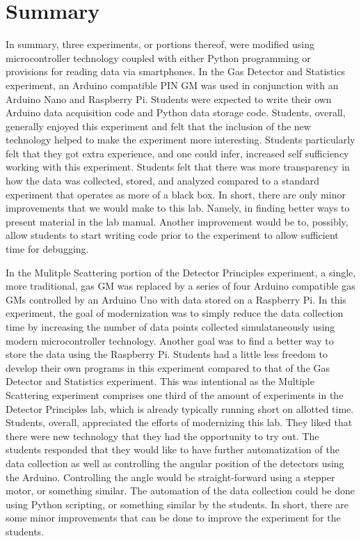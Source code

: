 \section{Summary}
In summary, three experiments, or portions thereof, were modified using microcontroller technology coupled with either Python programming or provisions for reading data via smartphones.
In the Gas Detector and Statistics experiment, an Arduino compatible PIN GM was used in conjunction with an Arduino Nano and Raspberry Pi.
Students were expected to write their own Arduino data acquisition code and Python data storage code.
Students, overall, generally enjoyed this experiment and felt that the inclusion of the new technology helped to make the experiment more interesting.
Students particularly felt that they got extra experience, and one could infer, increased self sufficiency working with this experiment.
Students felt that there was more transparency in how the data was collected, stored, and analyzed compared to a standard experiment that operates as more of a black box.
In short, there are only minor improvements that we would make to this lab.
Namely, in finding better ways to present material in the lab manual.
Another improvement would be to, possibly, allow students to start writing code prior to the experiment to allow sufficient time for debugging.

In the Mulitple Scattering portion of the Detector Principles experiment, a single, more traditional, gas GM was replaced by a series of four Arduino compatible gas GMs controlled by an Arduino Uno with data stored on a Raspberry Pi.
In this experiment, the goal of modernization was to simply reduce the data collection time by increasing the number of data points collected simulataneously using modern microcontroller technology.
Another goal was to find a better way to store the data using the Raspberry Pi.
Students had a little less freedom to develop their own programs in this experiment compared to that of the Gas Detector and Statistics experiment.
This was intentional as the Multiple Scattering experiment comprises one third of the amount of experiments in the Detector Principles lab, which is already typically running short on allotted time.
Students, overall, appreciated the efforts of modernizing this lab.
They liked that there were new technology that they had the opportunity to try out.
The students responded that they would like to have further automatization of the data collection as well as controlling the angular position of the detectors using the Arduino.
Controlling the angle would be straight-forward using a stepper motor, or something similar.
The automation of the data collection could be done using Python scripting, or something similar by the students.
In short, there are some minor improvements that can be done to improve the experiment for the students.

